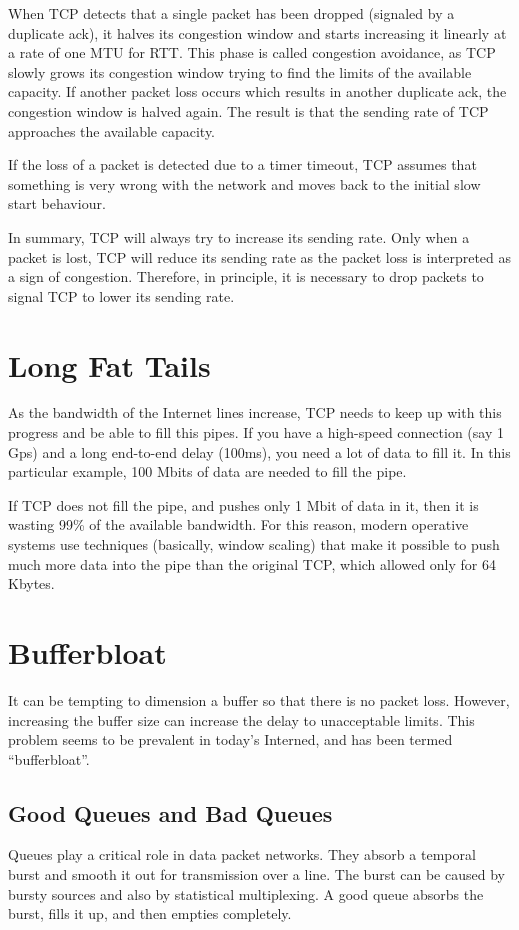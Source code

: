 When TCP detects that a single packet has been dropped (signaled by a duplicate ack), it halves its congestion window and starts increasing it linearly at a rate of one MTU for RTT.
This phase is called congestion avoidance, as TCP slowly grows its congestion window trying to find the limits of the available capacity.
If another packet loss occurs which results in another duplicate ack, the congestion window is halved again.
The result is that the sending rate of TCP approaches the available capacity.

If the loss of a packet is detected due to a timer timeout, TCP assumes that something is very wrong with the network and moves back to the initial slow start behaviour.

In summary, TCP will always try to increase its sending rate.
Only when a packet is lost, TCP will reduce its sending rate as the packet loss is interpreted as a sign of congestion.
Therefore, in principle, it is necessary to drop packets to signal TCP to lower its sending rate.

\section{Long Fat Tails}

As the bandwidth of the Internet lines increase, TCP needs to keep up with this progress and be able to fill this pipes.
If you have a high-speed connection (say 1 Gps) and a long end-to-end delay (100ms), you need a lot of data to fill it.
In this particular example, 100 Mbits of data are needed to fill the pipe.

If TCP does not fill the pipe, and pushes only 1 Mbit of data in it, then it is wasting 99\% of the available bandwidth.
For this reason, modern operative systems use techniques (basically, window scaling) that make it possible to push much more data into the pipe than the original TCP, which allowed only for 64 Kbytes.


\section{Bufferbloat}

It can be tempting to dimension a buffer so that there is no packet loss.
However, increasing the buffer size can increase the delay to unacceptable limits.
This problem seems to be prevalent in today's Interned, and has been termed ``bufferbloat''.

\subsection{Good Queues and Bad Queues}
Queues play a critical role in data packet networks.
They absorb a temporal burst and smooth it out for transmission over a line.
The burst can be caused by bursty sources and also by statistical multiplexing.
A good queue absorbs the burst, fills it up, and then empties completely.

